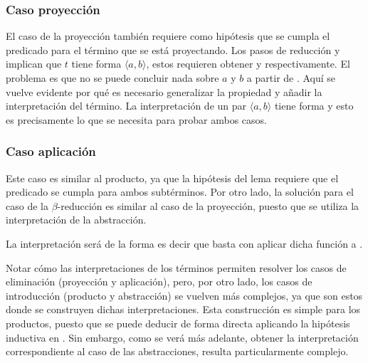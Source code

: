 
\subsubsection{Caso proyección}

El caso de la proyección también requiere como hipótesis que se cumpla el predicado para el término que se está proyectando.
Los pasos de reducción  y  implican que $t$ tiene forma $\langle a, b \rangle$, estos requieren obtener \snstar {} y \snstar {} respectivamente.
El problema es que no se puede concluir nada sobre $a$ y $b$ a partir de  .
Aquí se vuelve evidente por qué es necesario generalizar la propiedad  y añadir la interpretación del término.
La interpretación de un par $\langle a, b \rangle$ tiene forma \snstar{}  \snstar{} y esto es precisamente lo que se necesita para probar ambos casos.


\subsubsection{Caso aplicación}

Este caso es similar al producto, ya que la hipótesis del lema requiere que el predicado se cumpla para ambos subtérminos.
Por otro lado, la solución para el caso de la $\beta$-reducción es similar al caso de la proyección, puesto que se utiliza la interpretación de la abstracción.


La interpretación  será de la forma
\snstar{}
\snstar{}
es decir que basta con aplicar dicha función a .

Notar cómo las interpretaciones de los términos permiten resolver los casos de eliminación (proyección y aplicación), pero, por otro lado, los casos de introducción (producto y abstracción) se vuelven más complejos, ya que son estos donde se construyen dichas interpretaciones.
Esta construcción es simple para los productos, puesto que se puede deducir de forma directa aplicando la hipótesis inductiva en .	
Sin embargo, como se verá más adelante, obtener la interpretación correspondiente al caso de las abstracciones, resulta particularmente complejo.

